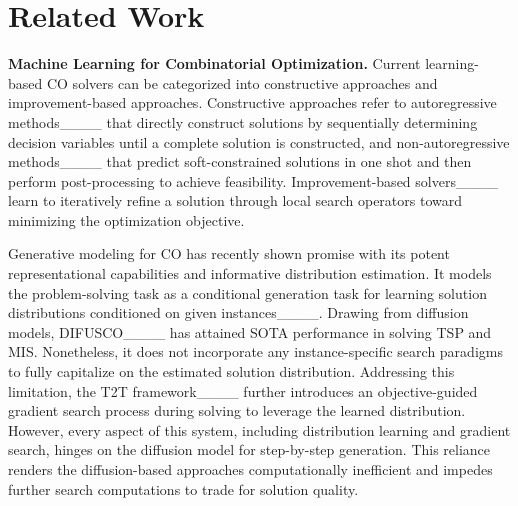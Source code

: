 \section{Related Work}
\textbf{Machine Learning for Combinatorial Optimization.} Current learning-based CO solvers can be categorized into constructive approaches and improvement-based approaches. Constructive approaches refer to autoregressive methods____ that directly construct solutions by sequentially determining decision variables until a complete solution is constructed, and non-autoregressive methods____ that predict soft-constrained solutions in one shot and then perform post-processing to achieve feasibility. Improvement-based solvers____ learn to iteratively refine a solution through local search operators toward minimizing the optimization objective. 



Generative modeling for CO has recently shown promise with its potent representational capabilities and informative distribution estimation. It models the problem-solving task as a conditional generation task for learning solution distributions conditioned on given instances____. Drawing from diffusion models, DIFUSCO____ has attained SOTA performance in solving TSP and MIS. Nonetheless, it does not incorporate any instance-specific search paradigms to fully capitalize on the estimated solution distribution. Addressing this limitation, the T2T framework____ further introduces an objective-guided gradient search process during solving to leverage the learned distribution. However, every aspect of this system, including distribution learning and gradient search, hinges on the diffusion model for step-by-step generation. This reliance renders the diffusion-based approaches computationally inefficient and impedes further search computations to trade for solution quality.


